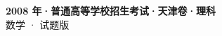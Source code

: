 \documentclass[zihao=-4, a4paper]{ctexart}
\begin{document}
\begin{center}
  {\Large\bfseries 2008 年·普通高等学校招生考试·天津卷·理科}\\[4pt]
  {\large 数学 · 试题版}
\end{center}
\medskip
{}

\end{document}
